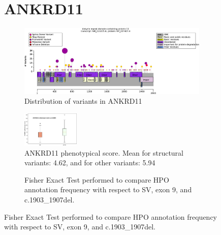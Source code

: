 \begin{figure}[htbp]
\section*{ANKRD11}
\centering
\begin{subfigure}[b]{0.95\textwidth}
\centering
\includegraphics[width=\textwidth]{ img/ANKRD11_protein_diagram.pdf} 
\captionsetup{justification=raggedright,singlelinecheck=false}
\caption{Distribution of variants in ANKRD11}
\end{subfigure}

\vspace{2em}

\begin{subfigure}[b]{0.95\textwidth}
\centering
\includegraphics[width=0.3\textwidth]{ img/ANKRD11_phenoscore.pdf} 
\captionsetup{justification=raggedright,singlelinecheck=false}
\caption{ANKRD11 phenotypical score. Mean for structural variants: 4.62, and for other variants: 5.94}
\end{subfigure}

\vspace{2em}

\begin{subfigure}[b]{0.95\textwidth}
\centering
{}
\captionsetup{justification=raggedright,singlelinecheck=false}
\caption{Fisher Exact Test performed to compare HPO annotation frequency with respect to SV, exon 9, and c.1903\_1907del.}
\end{subfigure}


\end{figure}

